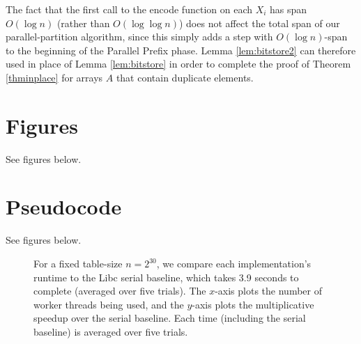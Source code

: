 \documentclass[twocolumn,10pt]{article}
\renewcommand{\paragraph}[1]{\vspace{0.09in}\noindent{\bf \boldmath #1.}}
\theoremstyle{remark}
\theoremstyle{remark}
\begin{document}
The fact that the first call to the encode function on each $X_i$ has
span $O(\log n)$ (rather than $O(\log \log n)$) does not affect the
total span of our parallel-partition algorithm, since this simply adds
a step with $O(\log n)$-span to the beginning of the Parallel Prefix
phase. Lemma \ref{lem:bitstore2} can therefore used in place of Lemma
\ref{lem:bitstore} in order to complete the proof of Theorem
\ref{thminplace} for arrays $A$ that contain duplicate elements.




\section{Figures}\label{sec:figures}
See figures below.

\section{Pseudocode}\label{sec:pseudocode}
See figures below.

\begin{figure*}[h]
  \begin{center}
    \CILKtable 
  \end{center}
    \caption{For a fixed table-size $n = 2^{30}$, we compare each
      implementation's runtime to the Libc serial baseline, which takes 3.9
      seconds to complete (averaged over five trials). The $x$-axis
      plots the number of worker threads being used, and the $y$-axis
      plots the multiplicative speedup over the serial baseline. Each
      time (including the serial baseline) is averaged over five trials.}
      \label{tablecilk}
\end{figure*}

\end{document}
